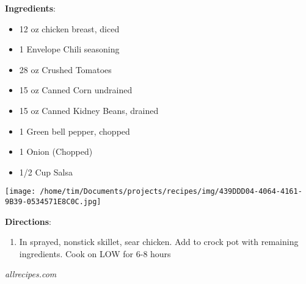 \documentclass[11pt, twoside, openany]{book}
\begin{document}
\begin{minipage}[t]{0.8\linewidth}
\textbf{Ingredients}:\vspace{-3mm}
\begin{multicols}{2}
\begin{itemize}\setlength\itemsep{-1mm}
\item 12 oz chicken breast, diced
\item 1 Envelope Chili seasoning
\item 28 oz Crushed Tomatoes
\item 15 oz Canned Corn undrained
\item 15 oz Canned Kidney Beans, drained
\item 1 Green bell pepper, chopped
\item 1 Onion (Chopped)
\item 1/2 Cup Salsa
\end{itemize}
\end{multicols}
\end{minipage}
\begin{minipage}[t]{0.2\linewidth}
\centering \strut\vspace*{-\baselineskip}\newline
\texttt{[image: /home/tim/Documents/projects/recipes/img/439DDD04-4064-4161-9B39-0534571E8C0C.jpg]}\\
\end{minipage}\vspace{3mm}
\textbf{Directions}:
\vspace{-3mm}\begin{enumerate}\setlength\itemsep{-1mm}
\item In sprayed, nonstick skillet, sear chicken. Add to crock pot with remaining ingredients. Cook on LOW for 6-8 hours
\end{enumerate}
 \label{red-velvet-cake}\hfill\textit{allrecipes.com}\\
\end{document}

